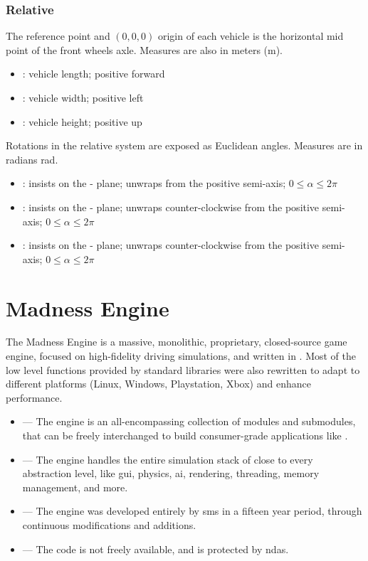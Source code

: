 \subsubsection{Relative}

The reference point and $(0,0,0)$ origin of each vehicle is the horizontal mid point of the front wheels axle. Measures are also in meters (\si{\meter}).

\begin{itemize}
	\item {}: vehicle length; positive forward
	\item {}: vehicle width; positive left
	\item {}: vehicle height; positive up
\end{itemize}

\FLOATnoindent Rotations in the relative system are exposed as Euclidean angles. Measures are in radians \si{\radian}.

\begin{itemize}
	\item {}: insists on the - plane; unwraps from the positive  semi-axis; $0 \leqslant \alpha \leqslant 2\pi$
	\item {}: insists on the - plane; unwraps counter-clockwise from the positive  semi-axis; $0 \leqslant \alpha \leqslant 2\pi$
	\item {}: insists on the - plane; unwraps counter-clockwise from the positive  semi-axis; $0 \leqslant \alpha \leqslant 2\pi$
\end{itemize}

\section{Madness Engine}\label{sc:software:madnessengine}

The Madness Engine is a massive, monolithic, proprietary, closed-source game engine, focused on high-fidelity driving simulations, and written in . Most of the low level functions provided by standard libraries were also rewritten to adapt to different platforms (Linux, Windows, Playstation, Xbox) and enhance performance.

\begin{itemize}
	\item {} --- The engine is an all-encompassing collection of modules and submodules, that can be freely interchanged to build consumer-grade applications like .
	\item {} --- The engine handles the entire simulation stack of close to every abstraction level, like \gls{gui}, physics, \gls{ai}, rendering, threading, memory management, and more.
	\item {} --- The engine was developed entirely by \gls{sms} in a fifteen year period, through continuous modifications and additions.
	\item {} --- The code is not freely available, and is protected by \glspl{nda}.
\end{itemize}

